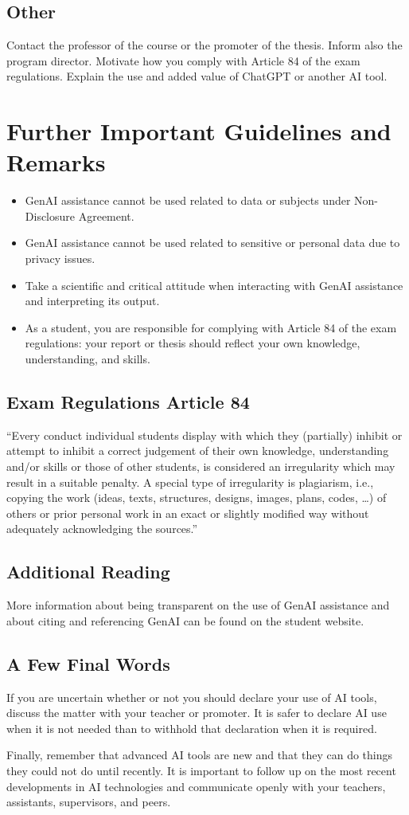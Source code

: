 \subsection*{Other}
Contact the professor of the course or the promoter of the thesis. Inform also the program director. Motivate how you comply with Article 84 of the exam regulations. Explain the use and added value of ChatGPT or another AI tool.

\section*{Further Important Guidelines and Remarks}
\begin{itemize}
    \item GenAI assistance cannot be used related to data or subjects under Non-Disclosure Agreement.
    \item GenAI assistance cannot be used related to sensitive or personal data due to privacy issues.
    \item Take a scientific and critical attitude when interacting with GenAI assistance and interpreting its output.
    \item As a student, you are responsible for complying with Article 84 of the exam regulations: your report or thesis should reflect your own knowledge, understanding, and skills.
\end{itemize}

\subsection*{Exam Regulations Article 84}
``Every conduct individual students display with which they (partially) inhibit or attempt to inhibit a correct judgement of their own knowledge, understanding and/or skills or those of other students, is considered an irregularity which may result in a suitable penalty. A special type of irregularity is plagiarism, i.e., copying the work (ideas, texts, structures, designs, images, plans, codes, \ldots) of others or prior personal work in an exact or slightly modified way without adequately acknowledging the sources.''

\subsection*{Additional Reading}
More information about being transparent on the use of GenAI assistance and about citing and referencing GenAI can be found on the student website.

\subsection*{A Few Final Words}
If you are uncertain whether or not you should declare your use of AI tools, discuss the matter with your teacher or promoter. It is safer to declare AI use when it is not needed than to withhold that declaration when it is required.

Finally, remember that advanced AI tools are new and that they can do things they could not do until recently. It is important to follow up on the most recent developments in AI technologies and communicate openly with your teachers, assistants, supervisors, and peers.
